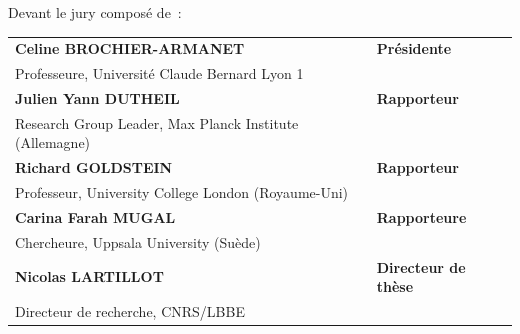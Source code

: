 Devant le jury composé de~:\\

\small {
	\begin{tabular}{ll}
		\textbf{Celine BROCHIER-ARMANET}           &\textbf{Présidente}\\
		Professeure, Université Claude Bernard Lyon 1\\
		\textbf{Julien Yann DUTHEIL}           &\textbf{Rapporteur}\\
		Research Group Leader, Max Planck Institute (Allemagne)\\
		\textbf{Richard GOLDSTEIN}           &\textbf{Rapporteur}\\
		Professeur, University College London (Royaume-Uni)\\
		\textbf{Carina Farah MUGAL}           &\textbf{Rapporteure}\\
		Chercheure, Uppsala University (Suède) \\
		\textbf{Nicolas LARTILLOT}           &\textbf{Directeur de thèse}\\
		Directeur de recherche, CNRS/LBBE\\	
	\end{tabular}
}
